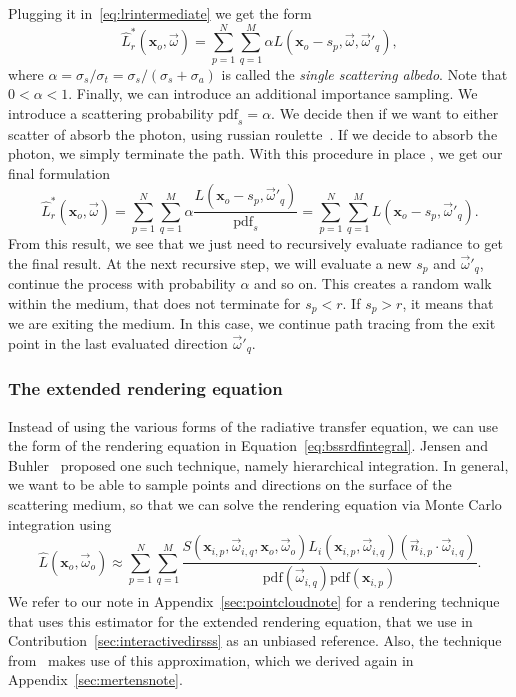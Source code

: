 Plugging it in~\ref{eq:lrintermediate} we get the form
\begin{equation*}
\hat{L}_r^*(\mathbf{x}_o, \vec{\omega}) = \sum_{p=1}^N \sum_{q=1}^M \alpha L(\mathbf{x}_o - s_p, \vec{\omega}, \vec{\omega}'_q),
\end{equation*}
where $\alpha = \sigma_s / \sigma_t = \sigma_s / (\sigma_s + \sigma_a)  $ is called the \emph{single scattering albedo}. Note that $0 < \alpha < 1$.  Finally, we can introduce an additional importance sampling. We introduce a scattering probability $\text{pdf}_s = \alpha$. We decide then if we want to either scatter of absorb the photon, using russian roulette~\cite{Arvo1990}. If we decide to absorb the photon, we simply terminate the path. With this procedure in place , we get our final formulation
\begin{equation*}
\hat{L}_r^*(\mathbf{x}_o, \vec{\omega}) = \sum_{p=1}^N \sum_{q=1}^M\alpha \frac{L(\mathbf{x}_o - s_p, \vec{\omega}'_q)} {\text{pdf}_s} = \sum_{p=1}^N\sum_{q=1}^M L(\mathbf{x}_o - s_p, \vec{\omega}'_q). 
\end{equation*}
From this result, we see that we just need to recursively evaluate radiance to get the final result. At the next recursive step, we will evaluate a new $s_p$ and $\vec{\omega}'_q$, continue the process with probability $\alpha$ and so on. This creates a random walk within the medium, that does not terminate for $s_p < r$. If $s_p > r$, it means that we are exiting the medium. In this case, we continue path tracing from the exit point in the last evaluated direction $\vec{\omega}'_q$.

\subsubsection{The extended rendering equation}

Instead of using the various forms of the radiative transfer equation, we can use the form of the rendering equation in Equation~\ref{eq:bssrdfintegral}. Jensen and Buhler~\cite{Jensen2002} proposed one such technique, namely hierarchical integration. In general, we want to be able to sample points and directions on the surface of the scattering medium, so that we can solve the rendering equation via Monte Carlo integration using
\begin{equation*}
\hat{L}(\mathbf{x}_o, \vec{\omega}_o) \approx \sum_{p = 1}^N \sum_{q = 1}^M \frac{S(\mathbf{x}_{i,p}, \vec{\omega}_{i,q}, \mathbf{x}_o, \vec{\omega}_o) L_i(\mathbf{x}_{i,p}, \vec{\omega}_{i,q}) (\vec{n}_{i,p} \cdot \vec{\omega}_{i,q})}{\text{pdf}(\vec{\omega}_{i,q}) \text{pdf}(\mathbf{x}_{i,p})}.
\end{equation*}
We refer to our note in Appendix~\ref{sec:pointcloudnote} for a rendering technique that uses this estimator for the extended rendering equation, that we use in Contribution~\ref{sec:interactivedirsss} as an unbiased reference. Also, the technique from~\cite{Mertens2003} makes use of this approximation, which we derived again in Appendix~\ref{sec:mertensnote}.

